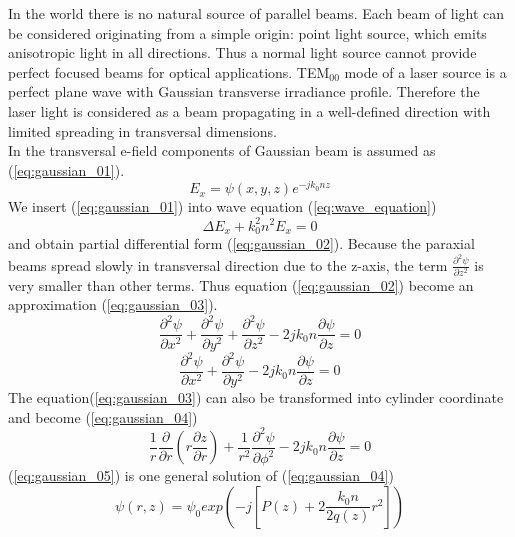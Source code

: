 In the world there is no natural source of parallel beams. Each beam of light can be considered originating from a simple origin: point light source, which emits anisotropic light in all directions. Thus a normal light source cannot provide perfect focused beams for optical applications. TEM$_{00}$ mode of a laser source is a perfect plane wave with Gaussian transverse irradiance profile\cite{CVI_Melles_Griot_Technical_Guide}. Therefore the laser light is considered as a beam propagating in a well-defined direction with limited spreading in transversal dimensions.\\ 

In \cite{ script_FT_TET} the transversal e-field components of Gaussian beam is assumed as (\ref{eq:gaussian_01}).
\begin{equation}
E_{x}=\psi(x,y,z)e^{-jk_{0}nz}
\label{eq:gaussian_01}
\end{equation}
We insert (\ref{eq:gaussian_01}) into wave equation (\ref{eq:wave_equation})
\begin{equation}
\Delta E_{x}+k^{2}_{0}n^{2}E_{x}=0
\label{eq:wave_equation}
\end{equation}
 and obtain partial differential form (\ref{eq:gaussian_02}). Because the paraxial beams spread slowly in transversal direction due to the z-axis, the term $\frac{\partial ^{2}\psi}{\partial z^2}$ is very smaller than other terms. Thus equation (\ref{eq:gaussian_02}) become an approximation (\ref{eq:gaussian_03}).
\begin{equation}
\frac{\partial ^{2}\psi}{\partial x^2}+\frac{\partial ^{2}\psi}{\partial y^2}+\frac{ \partial ^{2}\psi}{\partial z^2}-2jk_{0}n\frac{\partial\psi}{\partial z}=0
\label{eq:gaussian_02}
\end{equation}
\begin{equation}
\frac{ \partial ^{2}\psi}{\partial x^2}+\frac{\partial ^{2}\psi}{\partial y^2}-2jk_{0}n\frac{\partial\psi}{\partial z}=0
\label{eq:gaussian_03}
\end{equation}
The equation(\ref{eq:gaussian_03}) can also be transformed into cylinder coordinate and become (\ref{eq:gaussian_04})
\begin{equation}
\frac{1}{r}\frac{\partial}{\partial r}\left(r\frac{\partial z}{\partial r}\right)+\frac{1}{r^2}\frac{ \partial ^{2}\psi}{\partial \phi^2}-2jk_{0}n\frac{\partial\psi}{\partial z}=0
\label{eq:gaussian_04}
\end{equation}
(\ref{eq:gaussian_05}) is one general solution of (\ref{eq:gaussian_04})
\begin{equation}
\psi(r,z)=\psi_{0}exp\left(-j\left[P(z)+2 \frac{ k_{0}n}{2q(z)}r^2\right]\right)
\label{eq:gaussian_05}
\end{equation}
